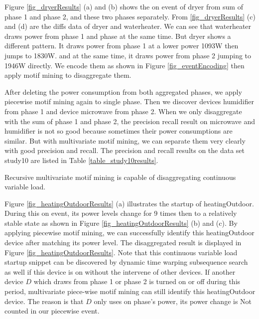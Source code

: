 Figure \ref{fig_dryerResults} (a) and (b) shows the on event of dryer from sum of phase 1 and phase 2, 
and these two phases separately. 
From \ref{fig_dryerResults} (c) and (d) are the diffs data of dryer and waterheater. 
We can see that waterheater draws power from phase 1 and phase at the same time. 
But dryer shows a different pattern. It draws power from phase 1 at a lower power 1093W then jumps to 1830W.
and at the same time, it draws power from phase 2 jumping to 1946W directly. 
We encode them as shown in Figure \ref{fig_eventEncoding} then apply motif mining to disaggregate them. 
 
After deleting the power consumption from both aggregated phases, 
we apply piecewise motif mining again to single phase. 
Then we discover devices humidifier from phase 1 
and device microwave from phase 2. 
When we only disaggregate with the sum of phase 1 and phase 2, 
the precision recall result on microwave and humidifier is not so good 
because sometimes their power consumptions are similar. 
But with multivariate motif mining, we can separate them very clearly 
with good precision and recall. 
The precision and recall results on the data set study10 are listed in Table \ref{table_study10results}.

Recursive multivariate motif mining is capable of disaggregating continuous variable load. 

Figure \ref{fig_heatingOutdoorResults} (a) illustrates the startup of heatingOutdoor.
During this on event, its power levels change for 9 times then to a relatively stable state as shown in 
Figure \ref{fig_heatingOutdoorResults} (b) and (c). 
By applying piecewise motif mining, 
we can successfully identify this heatingOutdoor device 
after matching its power level. 
The disaggregated result is displayed in Figure \ref{fig_heatingOutdoorResults}.
Note that this continuous variable load startup snippet can be discovered by dynamic time warping 
subsequence search as well if this device is on without the intervene of other devices.
If another device  $D$ which draws from phase 1 or phase 2 is turned on or off during this period, 
multivariate piece-wise motif mining can still identify this heatingOutdoor device. 
The reason is that $D$ only uses on phase's power, 
its power change is Not counted in our piecewise event. 
